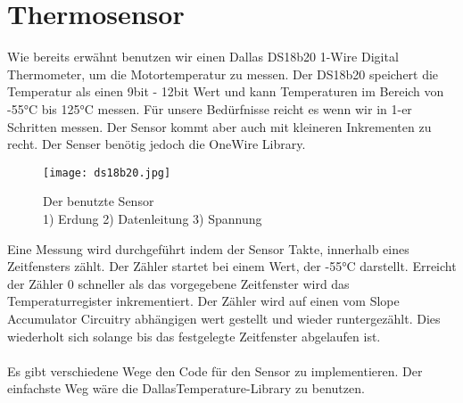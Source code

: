 \documentclass[12pt]{article}
\begin{document}
\section{Thermosensor} %
Wie bereits erwähnt benutzen wir einen Dallas DS18b20  1-Wire Digital Thermometer, um die Motortemperatur zu messen. Der DS18b20 speichert die Temperatur als einen 9bit - 12bit Wert und kann Temperaturen im Bereich von -55°C bis 125°C messen. Für unsere Bedürfnisse reicht es wenn wir in 1-er Schritten messen. Der Sensor kommt aber auch mit kleineren Inkrementen zu recht. Der Senser benötig jedoch die OneWire Library.\\

\begin{figure}[h]
	\texttt{[image: ds18b20.jpg]}
	\centering
	\caption{Der benutzte Sensor \\1) Erdung 2) Datenleitung 3) Spannung}
\end{figure}
Eine Messung wird durchgeführt indem der Sensor Takte, innerhalb eines Zeitfensters zählt. Der Zähler startet bei einem Wert, der -55°C darstellt. Erreicht der Zähler 0 schneller als das vorgegebene Zeitfenster wird das Temperaturregister inkrementiert. Der Zähler wird auf einen vom Slope Accumulator Circuitry abhängigen wert gestellt und wieder runtergezählt. Dies wiederholt sich solange bis das festgelegte Zeitfenster abgelaufen ist. \\
\\
Es gibt verschiedene Wege den Code für den Sensor zu implementieren. Der einfachste Weg wäre die DallasTemperature-Library zu benutzen.
\end{document}
